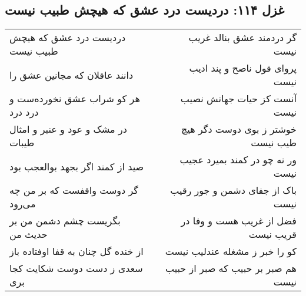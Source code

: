 \begin{center}
\section*{غزل ۱۱۴: دردیست درد عشق که هیچش طبیب نیست}
\label{sec:114}
\begin{longtable}{l p{0.5cm} r}
دردیست درد عشق که هیچش طبیب نیست
&&
گر دردمند عشق بنالد غریب نیست
\\
دانند عاقلان که مجانین عشق را
&&
پروای قول ناصح و پند ادیب نیست
\\
هر کو شراب عشق نخورده‌ست و درد درد
&&
آنست کز حیات جهانش نصیب نیست
\\
در مشک و عود و عنبر و امثال طیبات
&&
خوشتر ز بوی دوست دگر هیچ طیب نیست
\\
صید از کمند اگر بجهد بوالعجب بود
&&
ور نه چو در کمند بمیرد عجیب نیست
\\
گر دوست واقفست که بر من چه می‌رود
&&
باک از جفای دشمن و جور رقیب نیست
\\
بگریست چشم دشمن من بر حدیث من
&&
فضل از غریب هست و وفا در قریب نیست
\\
از خنده گل چنان به قفا اوفتاده باز
&&
کو را خبر ز مشغله عندلیب نیست
\\
سعدی ز دست دوست شکایت کجا بری
&&
هم صبر بر حبیب که صبر از حبیب نیست
\\
\end{longtable}
\end{center}
